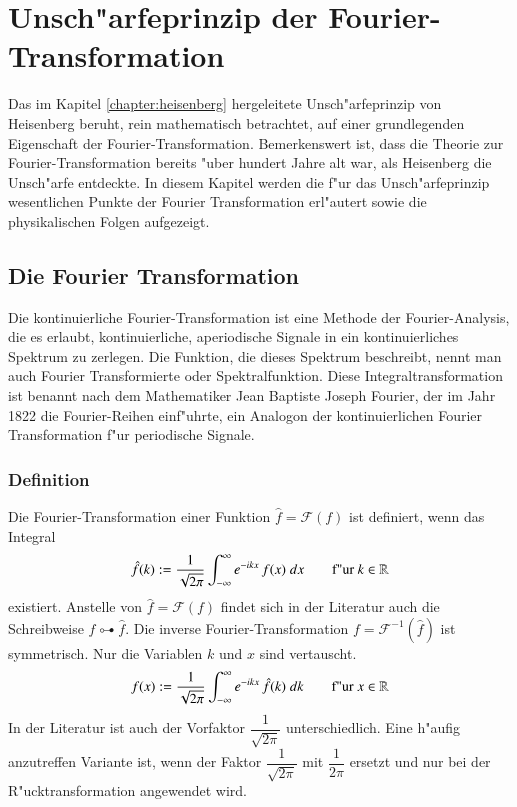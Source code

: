 \chapter{Unsch"arfeprinzip der Fourier-Transformation \label{chapter:heisenbergfourier}}
\begin{refsection}

Das im Kapitel \ref{chapter:heisenberg} hergeleitete Unsch"arfeprinzip von Heisenberg beruht, rein mathematisch betrachtet, auf einer grundlegenden Eigenschaft der Fourier-Transformation.
Bemerkenswert ist, dass die Theorie zur Fourier-Transformation bereits "uber hundert Jahre alt war, als Heisenberg die Unsch"arfe entdeckte.
In diesem Kapitel werden die f"ur das Unsch"arfeprinzip wesentlichen Punkte der Fourier Transformation erl"autert sowie die physikalischen Folgen aufgezeigt.

\section{Die Fourier Transformation}

Die kontinuierliche Fourier-Transformation ist eine Methode der Fourier-Analysis, die es erlaubt, kontinuierliche, aperiodische Signale in ein kontinuierliches Spektrum zu zerlegen.
Die Funktion, die dieses Spektrum beschreibt, nennt man auch Fourier Transformierte oder Spektralfunktion.
Diese Integraltransformation ist benannt nach dem Mathematiker Jean Baptiste Joseph Fourier, der im Jahr 1822 die Fourier-Reihen einf"uhrte, ein Analogon der kontinuierlichen Fourier Transformation f"ur periodische Signale.

\subsection{Definition}

Die Fourier-Transformation einer Funktion $\hat{f}=\mathcal{F}(f)$ ist definiert, wenn das Integral
\begin{equation}
\hat{f}(k) := \dfrac{1}{\sqrt{2\pi}}\int_{-\infty}^{\infty}e^{-i k x} \, f(x) \; dx \qquad \textnormal{f"ur } k \in \mathbb{R}
\end{equation}
existiert.
Anstelle von $\hat{f}=\mathcal{F}(f)$ findet sich in der Literatur auch die Schreibweise
$f \multimapdotbothA \hat{f}$.
Die inverse Fourier-Transformation $f=\mathcal{F}^{-1}(\hat{f})$ ist symmetrisch. Nur die Variablen $k$ und $x$ sind vertauscht.
\begin{equation}
f(x) := \dfrac{1}{\sqrt{2\pi}}\int_{-\infty}^{\infty}e^{-i k x} \, \hat{f}(k) \; dk \qquad \textnormal{f"ur } x \in \mathbb{R}
\end{equation}
In der Literatur ist auch der Vorfaktor $\dfrac{1}{\sqrt{2\pi}}$ unterschiedlich. Eine h"aufig anzutreffen Variante ist, wenn der Faktor $\dfrac{1}{\sqrt{2\pi}}$ mit $\dfrac{1}{2\pi}$ ersetzt und nur bei der R"ucktransformation angewendet wird.



\end{refsection}
